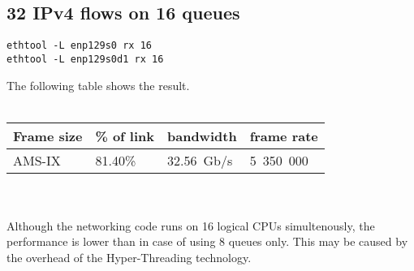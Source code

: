 
\subsection{32 IPv4 flows on 16 queues}
\begin{lstlisting}
ethtool -L enp129s0 rx 16
ethtool -L enp129s0d1 rx 16
\end{lstlisting}
The following table shows the result.
\\
\\
\begin{tabular}{ | l | l | l | l | }
\hline
Frame size & \% of link & bandwidth & frame rate \\
\hline
AMS-IX & 81.40\% & 32.56~Gb/s & 5~350~000 \\
\hline
\end{tabular}
\\
\\
Although the networking code runs on 16 logical CPUs simultenously,
the performance is lower than in case of using 8 queues only.
This may be caused by the overhead of the Hyper-Threading technology.
